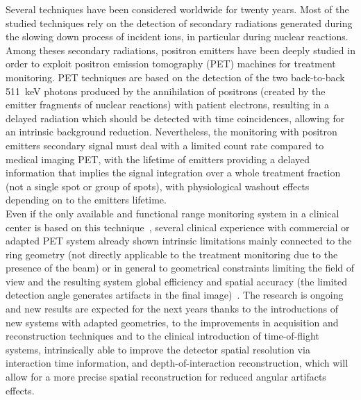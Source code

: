 Several techniques have been considered worldwide for twenty years. Most of the studied techniques rely on the detection of secondary radiations generated during the slowing down process of incident ions, in particular during nuclear reactions. Among theses secondary radiations, positron emitters have been deeply studied in order to exploit positron emission tomography (PET) machines for treatment monitoring. PET techniques are based on the detection of the two back-to-back 511~keV photons produced by the annihilation of positrons (created by the emitter fragments of nuclear reactions) with patient electrons, resulting in a delayed radiation which should be detected with time coincidences, allowing for an intrinsic background reduction. Nevertheless, the monitoring with positron emitters secondary signal must deal with a limited count rate compared to medical imaging PET, with the lifetime of emitters providing a delayed information that implies the signal integration over a whole treatment fraction (not a single spot or group of spots), with physiological washout effects depending on to the emitters lifetime.\\
Even if the only available and functional range monitoring system in a clinical center is based on this technique~\cite{ENGHARDT2004}, several clinical experience with commercial or adapted PET system already shown intrinsic limitations mainly connected to the ring geometry (not directly applicable to the treatment monitoring due to the presence of the beam) or in general to geometrical constraints limiting the field of view and the resulting system global efficiency and spatial accuracy (the limited detection angle generates artifacts in the final image)~\cite{PARODI2016}. The research is ongoing and new results are expected for the next years thanks to the introductions of new systems with adapted geometries, to the improvements in acquisition and reconstruction techniques and to the clinical introduction of time-of-flight systems, intrinsically able to improve the detector spatial resolution via interaction time information, and depth-of-interaction reconstruction, which will allow for a more precise spatial reconstruction for reduced angular artifacts effects.\\
